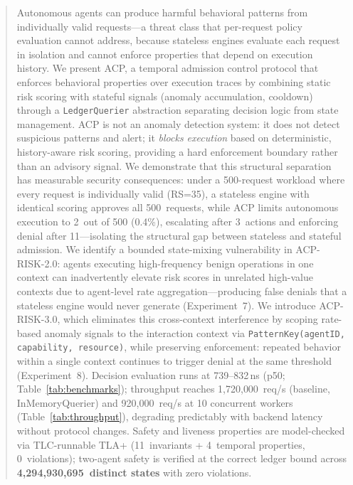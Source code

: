 \documentclass[11pt]{article}
\theoremstyle{definition}
\begin{document}
\begin{abstract}
Autonomous agents can produce harmful behavioral patterns from individually
valid requests---a threat class that per-request policy evaluation cannot
address, because stateless engines evaluate each request in isolation and cannot
enforce properties that depend on execution history.
We present ACP, a temporal admission control protocol that enforces behavioral
properties over execution traces by combining static risk scoring with stateful
signals (anomaly accumulation, cooldown) through a \texttt{LedgerQuerier}
abstraction separating decision logic from state management.
ACP is not an anomaly detection system: it does not detect suspicious patterns
and alert; it \emph{blocks execution} based on deterministic, history-aware
risk scoring, providing a hard enforcement boundary rather than an advisory signal.
We demonstrate that this structural separation has measurable security
consequences: under a 500-request workload where every request is individually
valid (RS=35), a stateless engine with identical scoring approves all 500~requests, while
ACP limits autonomous execution to 2~out of 500 (0.4\%), escalating after
3~actions and enforcing denial after 11---isolating the structural gap between
stateless and stateful admission.
We identify a bounded state-mixing vulnerability in ACP-RISK-2.0: agents
executing high-frequency benign operations in one context can inadvertently
elevate risk scores in unrelated high-value contexts due to agent-level
rate aggregation---producing false denials that a stateless engine would
never generate (Experiment~7).
We introduce ACP-RISK-3.0, which eliminates this cross-context interference
by scoping rate-based anomaly signals to the interaction context via
\texttt{PatternKey(agentID, capability, resource)}, while preserving
enforcement: repeated behavior within a single context continues to trigger
denial at the same threshold (Experiment~8).
Decision evaluation runs at 739--832\,ns (p50; Table~\ref{tab:benchmarks});
throughput reaches 1{,}720{,}000~req/s (baseline, InMemoryQuerier)
and 920{,}000~req/s at 10 concurrent workers (Table~\ref{tab:throughput}),
degrading predictably with backend latency without protocol changes.
Safety and liveness properties are model-checked via TLC-runnable TLA+
(11~invariants + 4~temporal properties, 0~violations);
two-agent safety is verified at the correct ledger bound across
\textbf{4,294,930,695~distinct states} with zero violations.

\end{abstract}
\end{document}
